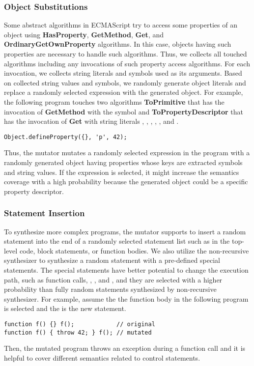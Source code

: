 

\subsubsection{Object Substitutions}
Some abstract algorithms in ECMAScript try to access some properties of an
object using \textbf{HasProperty}, \textbf{GetMethod}, \textbf{Get}, and
\textbf{OrdinaryGetOwnProperty} algorithms.  In this case, objects having such
properties are necessary to handle such algorithms.  Thus, we collects all
touched algorithms including any invocations of such property access algorithms.
For each invocation, we collects string literals and symbols used as its
arguments.  Based on collected string values and symbols, we randomly generate
object literals and replace a randomly selected expression with the generated
object.  For example, the following program touches two algorithms
\textbf{ToPrimitive} that has the invocation of \textbf{GetMethod} with the
symbol  and \textbf{ToPropertyDescriptor} that has the
invocation of \textbf{Get} with string literals , ,
, , , and
.
\begin{lstlisting}[style=myJSstyle]
Object.defineProperty({}, 'p', 42);
\end{lstlisting}
Thus, the mutator mutates a randomly selected expression in the program with a
randomly generated object having properties whose keys are extracted symbols and
string values.  If the expression  is selected, it might increase the
semantics coverage with a high probability because the generated object could be
a specific property descriptor.


\subsubsection{Statement Insertion}
To synthesize more complex programs, the mutator supports to insert a random
statement into the end of a randomly selected statement list such as in
the top-level code, block statements, or function bodies.  We also utilize the
non-recursive synthesizer to synthesize a random statement with a pre-defined
special statements.  The special statements have better potential to change the
execution path, such as function calls, , , and
, and they are selected with a higher probability than fully random
statements synthesized by non-recursive synthesizer.  For example, assume the
the function body in the following program is selected and the 
is the new statement.
\begin{lstlisting}[style=myJSstyle]
function f() {} f();            // original
function f() { throw 42; } f(); // mutated
\end{lstlisting}
Then, the mutated program throws an exception during a function call and it is
helpful to cover different semantics related to control statements.

